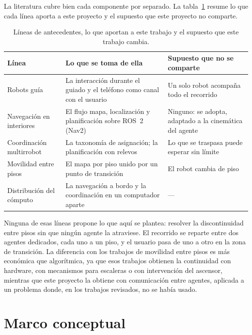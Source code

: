La literatura cubre bien cada componente por separado. La
tabla~\ref{tab:antecedentes} resume lo que cada línea aporta a este proyecto y el supuesto que
este proyecto no comparte.

\begin{table}[H]
  \centering\small
  \caption{Líneas de antecedentes, lo que aportan a este trabajo y el supuesto
    que este trabajo cambia.}
  \label{tab:antecedentes}
  \begin{tabular}{@{}p{}p{}p{}@{}}
    \toprule
    \textbf{Línea} & \textbf{Lo que se toma de ella} & \textbf{Supuesto que no se comparte} \\ \midrule
    Robots guía & La interacción durante el guiado y el teléfono como canal con el usuario & Un solo robot acompaña todo el recorrido \\ \addlinespace
    Navegación en interiores & El flujo mapa, localización y planificación sobre ROS~2 (Nav2) & Ninguno: se adopta, adaptado a la cinemática del agente \\ \addlinespace
    Coordinación multirrobot & La taxonomía de asignación; la planificación con relevos & Lo que se traspasa puede esperar sin límite \\ \addlinespace
    Movilidad entre pisos & El mapa por piso unido por un punto de transición & El robot cambia de piso \\ \addlinespace
    Distribución del cómputo & La navegación a bordo y la coordinación en un computador aparte & --- \\ \bottomrule
  \end{tabular}
\end{table}

Ninguna de esas líneas propone lo que aquí se plantea: resolver la discontinuidad entre pisos
sin que ningún agente la atraviese. El recorrido se reparte entre dos agentes dedicados, cada
uno a un piso, y el usuario pasa de uno a otro en la zona de transición. La diferencia con los
trabajos de movilidad entre pisos es más económica que algorítmica, ya que esos trabajos obtienen
la continuidad con hardware, con mecanismos para escaleras o con intervención del ascensor,
mientras que este proyecto la obtiene con comunicación entre agentes, aplicada a un problema
donde, en los trabajos revisados, no se había usado.

\section{Marco conceptual}
\label{sec:conceptual}

